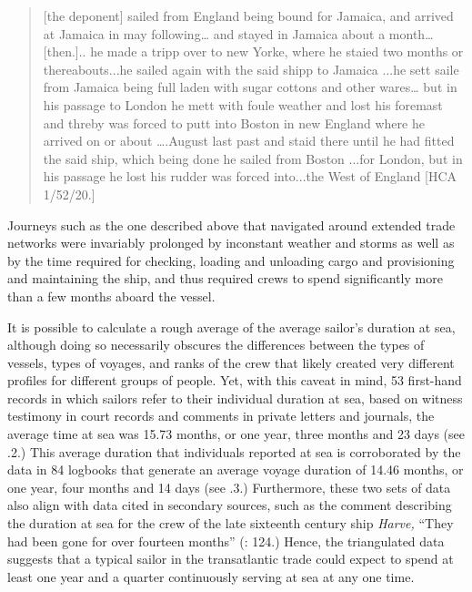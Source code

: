 \begin{quotation}
[the deponent] sailed from England being bound for Jamaica, and arrived at Jamaica in may following… and stayed in Jamaica about a month…[then.].. he made a tripp over to new Yorke, where he staied two months or thereabouts...he sailed again with the said shipp to Jamaica ...he sett saile from Jamaica being full laden with sugar cottons and other wares… but in his passage to London he mett with foule weather and lost his foremast and threby was forced to putt into Boston in new England where he arrived on or about ….August last past and staid there until he had fitted the said ship, which being done he sailed from Boston ...for London, but in his passage he lost his rudder was forced into...the West of England [HCA 1/52/20.]\end{quotation}

Journeys such as the one described above that navigated around extended trade networks were invariably prolonged by inconstant weather and storms as well as by the time required for  checking, loading and unloading cargo and provisioning and maintaining the ship, and thus required crews to spend significantly more than a few months aboard the vessel. 

It is possible to calculate a rough average of the average sailor’s duration at sea, although doing so necessarily obscures the differences between the types of vessels, types of voyages, and ranks of the crew that likely created very different profiles for different groups of people. Yet, with this caveat in mind, 53 first-hand records in which sailors refer to their individual duration at sea, based on witness testimony in court records and comments in private letters and journals, the average time at sea was 15.73 months, or one year, three months and 23 days (see .2.) This average duration that individuals reported at sea is corroborated by the data in 84 logbooks that generate an average voyage duration of 14.46 months, or one year, four months and 14 days (see .3.) Furthermore, these two sets of data also align with data cited in secondary sources, such as the comment describing the duration at sea for the crew of the late sixteenth century ship \textit{Harve,} “They had been gone for over fourteen months” (\citealt{Bicheno2012}: 124.) Hence, the triangulated data suggests that a typical sailor in the transatlantic trade could expect to spend at least one year and a quarter continuously serving at sea at any one time. 

